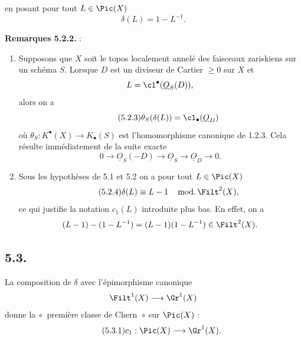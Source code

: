
en
posant pour tout \(L\in\Pic(X)\)
\[
 \delta(L)=1-L^{-1}.
\]

\textbf{Remarques 5.2.2.} :
\begin{enumerate}[label=\alph*)]
\item Supposons que \(X\) soit le topos localement annelé des faisceaux zariskiens sur un schéma \(S\). Lorsque \(D\) est un diviseur de Cartier \(\geq0\) sur \(X\) et
\[
 L=\cl^{\bullet}(\underline{O}_S(D)),
\]
alors on a
\begin{equation}\tag{5.2.3}
 \theta_S(\delta(L))=\cl_\bullet(\underline{O}_D)
\end{equation}
où \(\theta_S:K^{\bullet}(X)\to K_\bullet(S)\) est l'homomorphisme canonique de 1.2.3. Cela résulte immédiatement de la suite exacte
\[
0\longrightarrow\underline{O}_S(-D)\longrightarrow\underline{O}_S\longrightarrow\underline{O}_D\longrightarrow0.
\]

\item Sous les hypothèses de 5.1 et 5.2 on a pour tout \(L\in\Pic(X)\)
\begin{equation}\tag{5.2.4}
 \delta(L)\equiv L-1\quad\operatorname{mod.}\Filt^2(X),
\end{equation}
ce qui justifie la notation \(c_1(L)\) introduite plus bas. En effet, on a
\[
 (L-1)-(1-L^{-1})=(L-1)(1-L^{-1})\in\Filt^2(X).
\]
\end{enumerate}

\subsection*{5.3.}
La composition de \(\delta\) avec l'épimorphisme canonique
\[
 \Filt^1(X)\longrightarrow\Gr^1(X)
\]
donne la «~première classe de Chern~» sur \(\Pic(X)\) :
\begin{equation}\tag{5.3.1}
 c_1:\Pic(X)\longrightarrow\Gr^1(X).
\end{equation}

